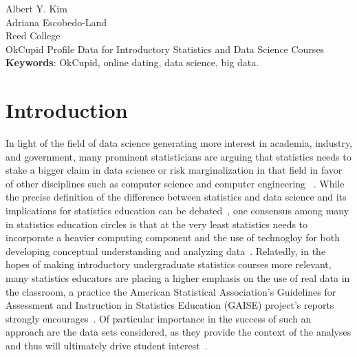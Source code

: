 \documentclass{article}\usepackage[]{graphicx}\usepackage[]{color}
\begin{document}
\noindent Albert Y. Kim\\
Adriana Escobedo-Land\\
Reed College\\
OkCupid Profile Data for Introductory Statistics and Data Science Courses\\

\noindent \textbf{Keywords}: OkCupid, online dating, data science, big data.

\begin{abstract}

\end{abstract}










%
\section{Introduction}\label{intro}
%
In light of the field of data science generating more interest in academia, industry, and government, many prominent statisticians are arguing that statistics needs to stake a bigger claim in data science or risk marginalization in that field in favor of other disciplines such as computer science and computer engineering ~\cite{YU:2014,DAVIDSON:2014}.  While the precise definition of the difference between statistics and data science and its implications for statistics education can be debated~\cite{WICKHAM:2014}, one consensus among many in statistics education circles is that at the very least statistics needs to incorporate a heavier computing component and the use of technogloy for both developing conceptual understanding and analyzing data~\cite{GAISE:05, NOLAN:LANG:2010}.  Relatedly, in the hopes of making introductory undergraduate statistics courses more relevant, many statistics educators are placing a higher emphasis on the use of real data in the classroom, a practice the American Statistical Association's Guidelines for Assessment and Instruction in Statistics Education (GAISE) project's reports strongly encourages~\cite{GAISE:05}.  Of particular importance in the success of such an approach are the data sets considered, as they provide the context of the analyses and thus will ultimately drive student interest~\cite{GOULD:2010}.
\end{document}
